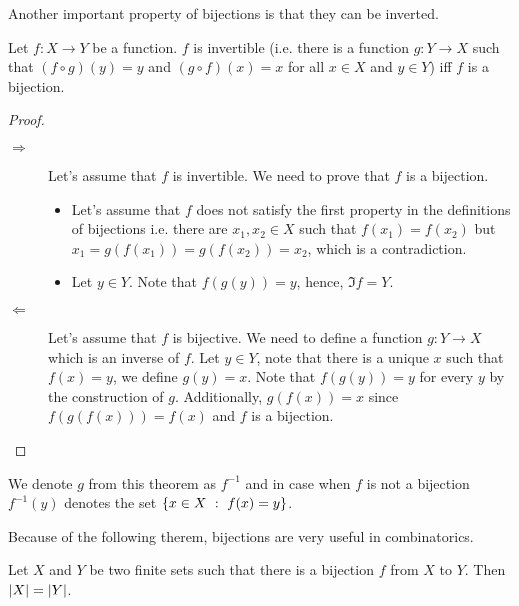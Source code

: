 Another important property of bijections is that they can be inverted.
\begin{theorem}
\label{theorem:inverse-of-bijections}
    Let $f : X \to Y$ be a function. $f$ is invertible (i.e. there is a function
    $g : Y \to X$ such that $(f \circ g)(y) = y$ and $(g \circ f)(x) = x$ for all
    $x \in X$ and $y \in Y$) iff $f$ is a bijection.
\end{theorem}
\begin{proof}
    \begin{description}
        \item[$\Rightarrow$] Let's assume that $f$ is invertible. We need to prove
            that $f$ is a bijection.
            \begin{itemize}
                \item Let's assume that $f$ does not satisfy the first property in the
                    definitions of bijections i.e. there are
                    $x_1, x_2 \in X$ such that $f(x_1) = f(x_2)$ but
                    $x_1 = g(f(x_1)) = g(f(x_2)) = x_2$, which is a
                    contradiction.
                \item Let $y \in Y$. Note that $f(g(y)) = y$, hence,
                    $\Im f = Y$.
            \end{itemize}

        \item[$\Leftarrow$] Let's assume that $f$ is bijective. We need to define a
            function $g : Y \to X$ which is an inverse of $f$. Let $y \in Y$, note
            that there is a unique $x$ such that $f(x) = y$, we define $g(y) = x$.
            Note that $f(g(y)) = y$ for every $y$ by the construction of $g$.
            Additionally, $g(f(x)) = x$ since $f(g(f(x))) = f(x)$ and $f$ is a
            bijection.
    \end{description}
\end{proof}
\noindent We denote $g$ from this theorem as $f^{-1}$ and in case when $f$ is
not a bijection $f^{-1}(y)$ denotes the set $\set[f(x) = y]{x \in X}$.

Because of the following therem, bijections are very useful in combinatorics.
\begin{theorem}
\label{theorem:bijection-to-equality}
    Let $X$ and $Y$ be two finite sets such that there is a bijection $f$ from
    $X$ to $Y$. Then $\left|{X}\right| = \left|{Y}\right|$.
\end{theorem}

